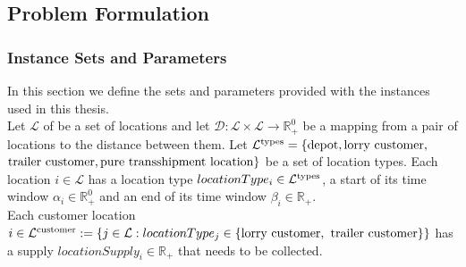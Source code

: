 \subsection{Problem Formulation}
\label{subsection:model}




\subsubsection{Instance Sets and Parameters}

In this section we define the sets and parameters provided with the instances used in this thesis.\\


Let
$\mathcal L $
of be a set of locations and let
$ \mathcal D : \mathcal L \times \mathcal L \rightarrow  \mathbb{R}^0_+$
be a mapping from a pair of locations to the distance between them.
Let
$\mathcal L^{\rm types} =  \{ {\rm \text{depot}}, {\rm \text{lorry customer}}, $ $ {\rm \text{trailer customer}}, {\rm \text{pure transshipment location}} \} $
be a set of location types.
Each location
$i \in \mathcal L$
has a location type
$locationType_i \in \mathcal L^{\rm types}$,
a start of its time window
$\alpha_i \in \mathbb{R}^0_+$
and an end of its time window
$\beta_i \in \mathbb{R}_+$.
\\

Each customer location
$i \in \mathcal L^{\rm customer} :=
\{ j \in \mathcal L: locationType_j \in \{ {\rm \text{lorry customer}}, $ $  {\rm  \text{trailer customer}} \} \} $
has a supply
$locationSupply_i \in \mathbb{R}_+$
that needs to be collected.
\\

